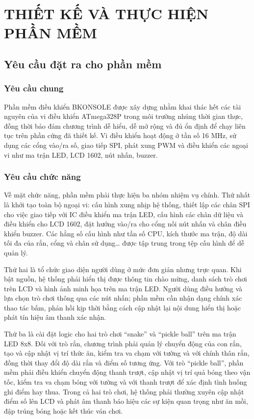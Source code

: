 \section{THIẾT KẾ VÀ THỰC HIỆN PHẦN MỀM}
\subsection{Yêu cầu đặt ra cho phần mềm}
\subsubsection{Yêu cầu chung}
Phần mềm điều khiển BKONSOLE được xây dựng nhằm khai thác hết các tài nguyên của vi điều khiển ATmega328P trong môi trường nhúng thời gian thực, đồng thời bảo đảm chương trình dễ hiểu, dễ mở rộng và đủ ổn định để chạy liên tục trên phần cứng đã thiết kế. Vi điều khiển hoạt động ở tần số 16 MHz, sử dụng các cổng vào/ra số, giao tiếp SPI, phát xung PWM và điều khiển các ngoại vi như ma trận LED, LCD 1602, nút nhấn, buzzer.
\subsubsection{Yêu cầu chức năng}
Về mặt chức năng, phần mềm phải thực hiện ba nhóm nhiệm vụ chính. Thứ nhất là khởi tạo toàn bộ ngoại vi: cấu hình xung nhịp hệ thống, thiết lập các chân SPI cho việc giao tiếp với IC điều khiển ma trận LED, cấu hình các chân dữ liệu và điều khiển cho LCD 1602, đặt hướng vào/ra cho cổng nối nút nhấn và chân điều khiển buzzer. Các hằng số cấu hình như tần số CPU, kích thước ma trận, độ dài tối đa của rắn, cổng và chân sử dụng… được tập trung trong tệp cấu hình để dễ quản lý. 

Thứ hai là tổ chức giao diện người dùng ở mức đơn giản nhưng trực quan. Khi bật nguồn, hệ thống phải hiển thị được thông tin chào mừng, danh sách trò chơi trên LCD và hình ảnh minh họa trên ma trận LED. Người dùng điều hướng và lựa chọn trò chơi thông qua các nút nhấn; phần mềm cần nhận dạng chính xác thao tác bấm, phản hồi kịp thời bằng cách cập nhật lại nội dung hiển thị hoặc phát tín hiệu âm thanh xác nhận.

Thứ ba là cài đặt logic cho hai trò chơi “snake” và “pickle ball” trên ma trận LED 8x8. Đối với trò rắn, chương trình phải quản lý chuyển động của con rắn, tạo và cập nhật vị trí thức ăn, kiểm tra va chạm với tường và với chính thân rắn, đồng thời thay đổi độ dài rắn và điểm số tương ứng. Với trò “pickle ball”, phần mềm phải điều khiển chuyển động thanh trượt, cập nhật vị trí quả bóng theo vận tốc, kiểm tra va chạm bóng với tường và với thanh trượt để xác định tình huống ghi điểm hay thua. Trong cả hai trò chơi, hệ thống phải thường xuyên cập nhật điểm số lên LCD và phát âm thanh báo hiệu các sự kiện quan trọng như ăn mồi, đập trúng bóng hoặc kết thúc ván chơi.
